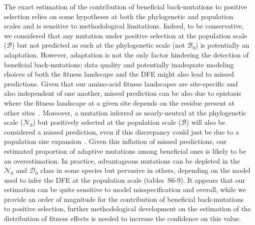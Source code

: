 \documentclass{article}
\newcommand{\SphyDel}{\mathcal{D}_0}
\newcommand{\SphyNeu}{\mathcal{N}_0}
\newcommand{\SphyBen}{\mathcal{B}_0}
\newcommand{\SpopBen}{\mathcal{B}}
\begin{document}
    The exact estimation of the contribution of beneficial back-mutations to positive selection relies on some hypotheses at both the phylogenetic and population scales and is sensitive to methodological limitations.
    Indeed, to be conservative, we considered that any mutation under positive selection at the population scale ($\SpopBen$) but not predicted as such at the phylogenetic scale (not $\SphyBen$) is potentially an adaptation.
    However, adaptation is not the only factor hindering the detection of beneficial back-mutations; data quality and potentially inadequate modeling choices of both the fitness landscape and the DFE might also lead to missed predictions.
    Given that our amino-acid fitness landscapes are site-specific and also independent of one another, missed prediction can be also due to epistasis where the fitness landscape at a given site depends on the residue present at other sites~\cite{starr_epistasis_2016, park_epistatic_2022}.
    Moreover, a mutation inferred as nearly-neutral at the phylogenetic scale ($\SphyNeu$) but positively selected at the population scale ($\SpopBen$) will also be considered a missed prediction, even if this discrepancy could just be due to a population size expansion~\cite{lanfear_population_2014, jones_shifting_2017, platt_protein_2018}.
    Given this inflation of missed predictions, our estimated proportion of adaptive mutations among beneficial ones is likely to be an overestimation.
    In practice, advantageous mutations can be depleted in the $\SphyNeu$ and $\SphyDel$ class in some species but pervasive in others, depending on the model used to infer the DFE at the population scale (tables~S6-9).
    It appears that our estimation can be quite sensitive to model misspecification and overall, while we provide an order of magnitude for the contribution of beneficial back-mutations to positive selection, further methodological development on the estimation of the distribution of fitness effects is needed to increase the confidence on this value.
\end{document}
